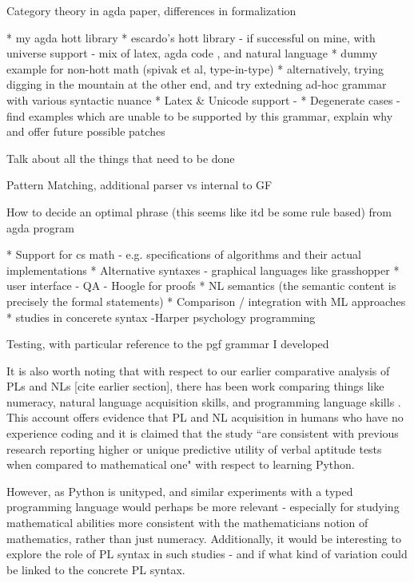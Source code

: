 
Category theory in agda paper, differences in formalization

* my agda hott library
* escardo's hott library 
  - if successful on mine, with universe support
  - mix of latex, agda code , and natural language 
* dummy example for non-hott math (spivak et al, type-in-type)
* alternatively, trying digging in the mountain at the other end, and try extedning ad-hoc grammar with various syntactic nuance
* Latex & Unicode support  - 
* Degenerate cases
  - find examples which are unable to be supported by this grammar, explain why and offer future possible patches

Talk about all the things that need to be done

Pattern Matching, additional parser vs internal to GF

How to decide an optimal phrase (this seems like itd be some rule based) from agda program

* Support for cs math - e.g. specifications of algorithms and their actual implementations
* Alternative syntaxes - graphical languages like grasshopper
* user interface
  - QA
  - Hoogle for proofs
* NL semantics (the semantic content is precisely the formal statements)
* Comparison / integration with ML approaches
* studies in concerete syntax -Harper psychology {\intersect} programming

Testing, with particular reference to the pgf grammar I developed


It is also worth noting that with respect to our earlier comparative analysis
of PLs and NLs [cite earlier section], there has been work comparing things like
numeracy, natural language acquisition skills, and programming language skills
\cite{prat2020relating}.  This account offers evidence that PL and NL acquisition
in humans who have no experience coding 
and it is claimed that the study ``are consistent with previous research
reporting higher or unique predictive utility of verbal aptitude tests when
compared to mathematical one" with respect to learning Python.

However, as Python is unityped, and similar experiments with a typed programming
language would perhaps be more relevant - especially for studying mathematical
abilities more consistent with the mathematicians notion of mathematics, rather
than just numeracy. Additionally, it would be interesting to explore the role of
PL syntax in such studies - and if what kind of variation could be linked to the
concrete PL syntax.

